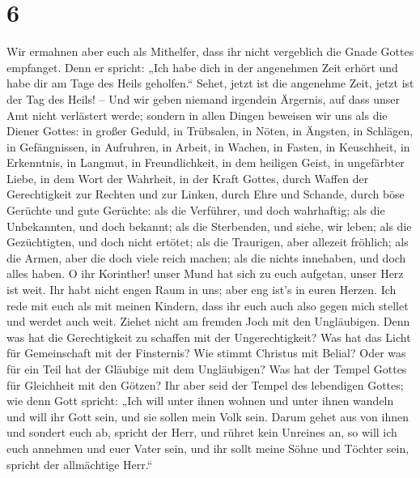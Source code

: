 \hypertarget{section-5}{%
\section{6}\label{section-5}}

 Wir ermahnen aber euch als Mithelfer, dass ihr nicht
vergeblich die Gnade Gottes empfanget.  Denn er spricht:
„Ich habe dich in der angenehmen Zeit erhört und habe dir am Tage des
Heils geholfen.`` Sehet, jetzt ist die angenehme Zeit, jetzt ist der Tag
des Heils! --  Und wir geben niemand irgendein Ärgernis,
auf dass unser Amt nicht verlästert werde;  sondern in
allen Dingen beweisen wir uns als die Diener Gottes: in großer Geduld,
in Trübsalen, in Nöten, in Ängsten,  in Schlägen, in
Gefängnissen, in Aufruhren, in Arbeit, in Wachen, in Fasten,
 in Keuschheit, in Erkenntnis, in Langmut, in
Freundlichkeit, in dem heiligen Geist, in ungefärbter Liebe,
 in dem Wort der Wahrheit, in der Kraft Gottes, durch
Waffen der Gerechtigkeit zur Rechten und zur Linken, 
durch Ehre und Schande, durch böse Gerüchte und gute Gerüchte: als die
Verführer, und doch wahrhaftig;  als die Unbekannten, und
doch bekannt; als die Sterbenden, und siehe, wir leben; als die
Gezüchtigten, und doch nicht ertötet;  als die Traurigen,
aber allezeit fröhlich; als die Armen, aber die doch viele reich machen;
als die nichts innehaben, und doch alles haben.  O ihr
Korinther! unser Mund hat sich zu euch aufgetan, unser Herz ist weit.
 Ihr habt nicht engen Raum in uns; aber eng ist's in
euren Herzen.  Ich rede mit euch als mit meinen Kindern,
dass ihr euch auch also gegen mich stellet und werdet auch weit.
 Ziehet nicht am fremden Joch mit den Ungläubigen. Denn
was hat die Gerechtigkeit zu schaffen mit der Ungerechtigkeit? Was hat
das Licht für Gemeinschaft mit der Finsternis?  Wie
stimmt Christus mit Belial? Oder was für ein Teil hat der Gläubige mit
dem Ungläubigen?  Was hat der Tempel Gottes für
Gleichheit mit den Götzen? Ihr aber seid der Tempel des lebendigen
Gottes; wie denn Gott spricht: „Ich will unter ihnen wohnen und unter
ihnen wandeln und will ihr Gott sein, und sie sollen mein Volk sein.
 Darum gehet aus von ihnen und sondert euch ab, spricht
der Herr, und rühret kein Unreines an, so will ich euch annehmen
 und euer Vater sein, und ihr sollt meine Söhne und
Töchter sein, spricht der allmächtige Herr.``

